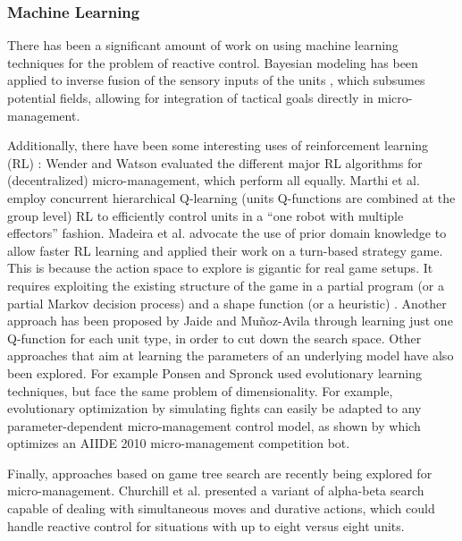 \documentclass{llncs}
\begin{document}
\subsubsection*{Machine Learning}
There has been a significant amount  of work on using machine learning
techniques for the problem of  reactive control. Bayesian modeling has
been applied  to inverse  fusion of  the sensory  inputs of  the units
\cite{SynnaeveMicroCig11}, which  subsumes potential  fields, allowing
for integration of tactical goals directly in micro-management.

Additionally, there  have been some interesting  uses of reinforcement
learning  (RL)   \cite{Sutton}:  Wender  and   Watson  \cite{WenderRL}
evaluated  the  different  major  RL  algorithms  for  (decentralized)
micro-management,    which   perform    all    equally.   Marthi    et
al. \cite{Marthi05}  employ concurrent hierarchical  Q-learning (units
Q-functions are combined at the group level) RL to efficiently control
units in a  ``one robot with multiple effectors''  fashion. Madeira et
al. \cite{Madeira06}  advocate the  use of  prior domain  knowledge to
allow  faster RL  learning  and  applied their  work  on a  turn-based
strategy game. This is because the action space to explore is gigantic
for real game setups. It requires exploiting the existing structure of
the game in  a partial program (or a partial  Markov decision process)
and  a  shape  function  (or  a  heuristic)  \cite{Marthi05}.  Another
approach   has   been   proposed    by   Jaide   and   Mu{\~n}oz-Avila
\cite{jaidee2012classq} through learning just  one Q-function for each
unit type,  in order to  cut down  the search space.  Other approaches
that aim at  learning the parameters of an underlying  model have also
been  explored.   For  example  Ponsen  and   Spronck  \cite{GA}  used
evolutionary  learning  techniques,  but  face  the  same  problem  of
dimensionality. For  example, evolutionary optimization  by simulating
fights   can   easily   be    adapted   to   any   parameter-dependent
micro-management control  model, as  shown by  \cite{OthmanSimu} which
optimizes an AIIDE 2010 micro-management competition bot.

Finally,  approaches based  on  game tree  search  are recently  being
explored        for        micro-management.       Churchill        et
al. \cite{churchill2012AIIDE} presented a variant of alpha-beta search
capable of dealing with simultaneous moves and durative actions, which
could handle reactive  control for situations with up  to eight versus
eight units.
\end{document}
